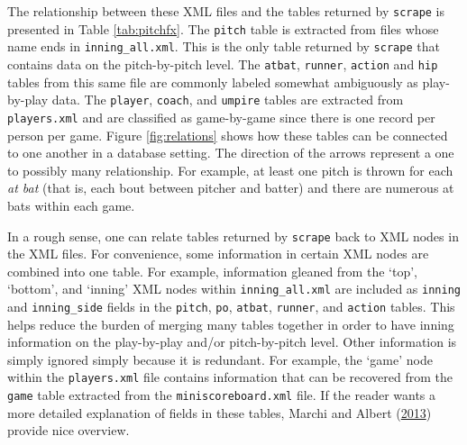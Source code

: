 \documentclass[12pt,]{isuthesis}
\begin{document}
The relationship between these XML files and the tables returned by
\texttt{scrape} is presented in Table \ref{tab:pitchfx}. The
\texttt{pitch} table is extracted from files whose name ends in
\texttt{inning\_all.xml}. This is the only table returned by
\texttt{scrape} that contains data on the pitch-by-pitch level. The
\texttt{atbat}, \texttt{runner}, \texttt{action} and \texttt{hip} tables
from this same file are commonly labeled somewhat ambiguously as
play-by-play data. The \texttt{player}, \texttt{coach}, and
\texttt{umpire} tables are extracted from \texttt{players.xml} and are
classified as game-by-game since there is one record per person per
game. Figure \ref{fig:relations} shows how these tables can be connected
to one another in a database setting. The direction of the arrows
represent a one to possibly many relationship. For example, at least one
pitch is thrown for each \textit{at bat} (that is, each bout between
pitcher and batter) and there are numerous at bats within each game.

In a rough sense, one can relate tables returned by \texttt{scrape} back
to XML nodes in the XML files. For convenience, some information in
certain XML nodes are combined into one table. For example, information
gleaned from the `top', `bottom', and `inning' XML nodes within
\texttt{inning\_all.xml} are included as \texttt{inning} and
\texttt{inning\_side} fields in the \texttt{pitch}, \texttt{po},
\texttt{atbat}, \texttt{runner}, and \texttt{action} tables. This helps
reduce the burden of merging many tables together in order to have
inning information on the play-by-play and/or pitch-by-pitch level.
Other information is simply ignored simply because it is redundant. For
example, the `game' node within the \texttt{players.xml} file contains
information that can be recovered from the \texttt{game} table extracted
from the \texttt{miniscoreboard.xml} file. If the reader wants a more
detailed explanation of fields in these tables, Marchi and Albert
(\protect\hyperlink{ref-baseball}{2013}) provide nice overview.
\end{document}

